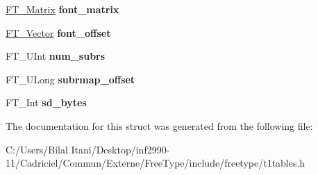 \begin{DoxyCompactItemize}
\item 
\hyperlink{struct_f_t___matrix__}{F\+T\+\_\+\+Matrix} {\bfseries font\+\_\+matrix}\hypertarget{struct_c_i_d___face_dict_rec___aa418f6ce40b7574b6234e0ab48377e4b}{}\label{struct_c_i_d___face_dict_rec___aa418f6ce40b7574b6234e0ab48377e4b}

\item 
\hyperlink{struct_f_t___vector__}{F\+T\+\_\+\+Vector} {\bfseries font\+\_\+offset}\hypertarget{struct_c_i_d___face_dict_rec___aa62daa8d45ed4a817f1207cbd452d61e}{}\label{struct_c_i_d___face_dict_rec___aa62daa8d45ed4a817f1207cbd452d61e}

\item 
F\+T\+\_\+\+U\+Int {\bfseries num\+\_\+subrs}\hypertarget{struct_c_i_d___face_dict_rec___a611c406c8d7cd2e37d077070f4bb3ebe}{}\label{struct_c_i_d___face_dict_rec___a611c406c8d7cd2e37d077070f4bb3ebe}

\item 
F\+T\+\_\+\+U\+Long {\bfseries subrmap\+\_\+offset}\hypertarget{struct_c_i_d___face_dict_rec___a45d58111727af70018289e7c5b64ba8c}{}\label{struct_c_i_d___face_dict_rec___a45d58111727af70018289e7c5b64ba8c}

\item 
F\+T\+\_\+\+Int {\bfseries sd\+\_\+bytes}\hypertarget{struct_c_i_d___face_dict_rec___aecdf98f9671f22c1715ec929b77767ce}{}\label{struct_c_i_d___face_dict_rec___aecdf98f9671f22c1715ec929b77767ce}

\end{DoxyCompactItemize}


The documentation for this struct was generated from the following file\+:\begin{DoxyCompactItemize}
\item 
C\+:/\+Users/\+Bilal Itani/\+Desktop/inf2990-\/11/\+Cadriciel/\+Commun/\+Externe/\+Free\+Type/include/freetype/t1tables.\+h\end{DoxyCompactItemize}

